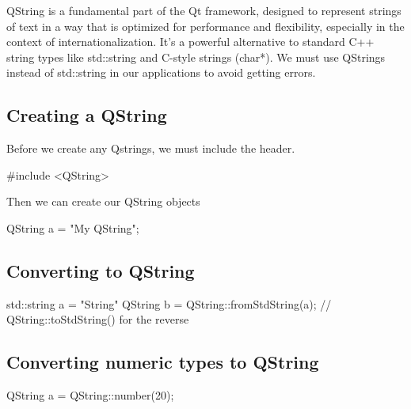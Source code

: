 \documentclass{report}
\begin{document}
    \bigbreak \noindent 
    \bigbreak \noindent 
    QString is a fundamental part of the Qt framework, designed to represent strings of text in a way that is optimized for performance and flexibility, especially in the context of internationalization. It's a powerful alternative to standard C++ string types like std::string and C-style strings (char*).
    \bigbreak \noindent 
    We must use QStrings instead of std::string in our applications to avoid getting errors.
    \bigbreak \noindent 
    \subsection{Creating a QString}
    \bigbreak \noindent 
    Before we create any Qstrings, we must include the header.
    \bigbreak \noindent 
    \begin{cppcode}
#include <QString>
    \end{cppcode}
    \bigbreak \noindent 
    Then we can create our QString objects
    \bigbreak \noindent 
    \begin{cppcode}
    QString a = "My QString";
    \end{cppcode}
    \bigbreak \noindent 
    \subsection{Converting to QString}
    \bigbreak \noindent 
    \begin{cppcode}
std::string a = "String"
QString b = QString::fromStdString(a); // QString::toStdString() for the reverse
    \end{cppcode}

    \pagebreak
    \subsection{Converting numeric types to QString}
    \bigbreak \noindent 
    \begin{cppcode}
    QString a = QString::number(20);
    \end{cppcode}

    \bigbreak \noindent 
\end{document}
